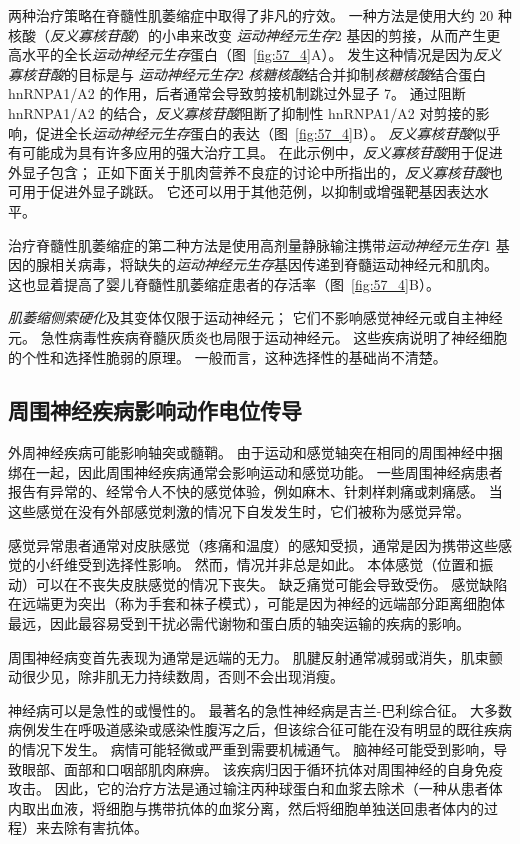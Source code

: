 两种治疗策略在脊髓性肌萎缩症中取得了非凡的疗效。
一种方法是使用大约 20 种核酸（\textit{反义寡核苷酸}）的小串来改变 \textit{运动神经元生存}2 基因的剪接，从而产生更高水平的全长\textit{运动神经元生存}蛋白（图~\ref{fig:57_4}A）。
发生这种情况是因为\textit{反义寡核苷酸}的目标是与 \textit{运动神经元生存}2 \textit{核糖核酸}结合并抑制\textit{核糖核酸}结合蛋白 hnRNPA1/A2 的作用，后者通常会导致剪接机制跳过外显子 7。
通过阻断 hnRNPA1/A2 的结合，\textit{反义寡核苷酸}阻断了抑制性 hnRNPA1/A2 对剪接的影响，促进全长\textit{运动神经元生存}蛋白的表达（图~\ref{fig:57_4}B）。
\textit{反义寡核苷酸}似乎有可能成为具有许多应用的强大治疗工具。
在此示例中，\textit{反义寡核苷酸}用于促进外显子包含；
正如下面关于肌肉营养不良症的讨论中所指出的，\textit{反义寡核苷酸}也可用于促进外显子跳跃。
它还可以用于其他范例，以抑制或增强靶基因表达水平。


治疗脊髓性肌萎缩症的第二种方法是使用高剂量静脉输注携带\textit{运动神经元生存}1 基因的腺相关病毒，将缺失的\textit{运动神经元生存}基因传递到脊髓运动神经元和肌肉。
这也显着提高了婴儿脊髓性肌萎缩症患者的存活率（图~\ref{fig:57_4}B）。


\textit{肌萎缩侧索硬化}及其变体仅限于运动神经元；
它们不影响感觉神经元或自主神经元。
急性病毒性疾病脊髓灰质炎也局限于运动神经元。
这些疾病说明了神经细胞的个性和选择性脆弱的原理。
一般而言，这种选择性的基础尚不清楚。



\subsection{周围神经疾病影响动作电位传导}

外周神经疾病可能影响轴突或髓鞘。
由于运动和感觉轴突在相同的周围神经中捆绑在一起，因此周围神经疾病通常会影响运动和感觉功能。
一些周围神经病患者报告有异常的、经常令人不快的感觉体验，例如麻木、针刺样刺痛或刺痛感。
当这些感觉在没有外部感觉刺激的情况下自发发生时，它们被称为感觉异常。


感觉异常患者通常对皮肤感觉（疼痛和温度）的感知受损，通常是因为携带这些感觉的小纤维受到选择性影响。 然而，情况并非总是如此。
本体感觉（位置和振动）可以在不丧失皮肤感觉的情况下丧失。 缺乏痛觉可能会导致受伤。
感觉缺陷在远端更为突出（称为手套和袜子模式），可能是因为神经的远端部分距离细胞体最远，因此最容易受到干扰必需代谢物和蛋白质的轴突运输的疾病的影响。


周围神经病变首先表现为通常是远端的无力。
肌腱反射通常减弱或消失，肌束颤动很少见，除非肌无力持续数周，否则不会出现消瘦。


神经病可以是急性的或慢性的。
最著名的急性神经病是吉兰-巴利综合征。
大多数病例发生在呼吸道感染或感染性腹泻之后，但该综合征可能在没有明显的既往疾病的情况下发生。
病情可能轻微或严重到需要机械通气。
脑神经可能受到影响，导致眼部、面部和口咽部肌肉麻痹。
该疾病归因于循环抗体对周围神经的自身免疫攻击。
因此，它的治疗方法是通过输注丙种球蛋白和血浆去除术（一种从患者体内取出血液，将细胞与携带抗体的血浆分离，然后将细胞单独送回患者体内的过程）来去除有害抗体。


